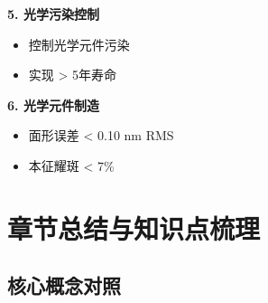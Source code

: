 \documentclass[UTF8,12pt,a4paper]{ctexart}
\begin{document}
\textbf{5. 光学污染控制}
\begin{itemize}
    \item 控制光学元件污染
    \item 实现 > 5年寿命
\end{itemize}

\textbf{6. 光学元件制造}
\begin{itemize}
    \item 面形误差 < 0.10 nm RMS
    \item 本征耀斑 < 7\%
\end{itemize}

\section{章节总结与知识点梳理}

\subsection{核心概念对照}
\end{document}
